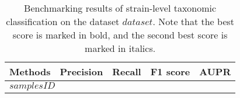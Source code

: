
\begin{table}[ht]
\renewcommand\arraystretch{1.}
    \centering
    \small
    \setlength\tabcolsep{2pt} 
    \begin{tabular}{p{}| p{1.5cm}<{\centering} p{1.5cm}<{\centering} p{1.5cm}<{\centering} p{1.5cm}<{\centering} }

    \toprule
    Methods & Precision & Recall & F1 score & AUPR \\
    \midrule
    \multicolumn{4}{l}{$samplesID$} \\
    \hline     
\bottomrule
    \end{tabular}
    \vspace{1mm}
    \caption{Benchmarking results of strain-level taxonomic classification on the dataset $dataset$. Note that the best score is marked in bold, and the second best score is marked in italics. }
    \label{tab:res_strain_$dataset$}
\end{table}
    